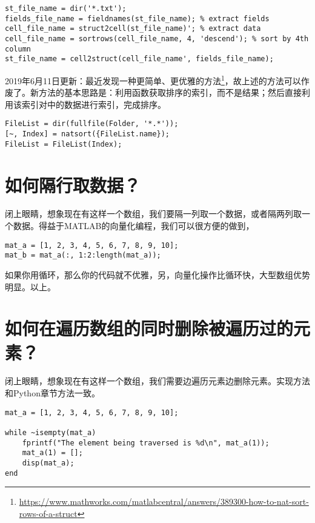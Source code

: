 \begin{verbatim}
st_file_name = dir('*.txt');
fields_file_name = fieldnames(st_file_name); % extract fields
cell_file_name = struct2cell(st_file_name)'; % extract data
cell_file_name = sortrows(cell_file_name, 4, 'descend'); % sort by 4th column
st_file_name = cell2struct(cell_file_name', fields_file_name);
\end{verbatim}

2019年6月11日更新：最近发现一种更简单、更优雅的方法\footnote{\url{https://www.mathworks.com/matlabcentral/answers/389300-how-to-nat-sort-rows-of-a-struct}}，故上述的方法可以作废了。新方法的基本思路是：利用函数获取排序的索引，而不是结果；然后直接利用该索引对中的数据进行索引，完成排序。

\begin{verbatim}
FileList = dir(fullfile(Folder, '*.*'));
[~, Index] = natsort({FileList.name});
FileList = FileList(Index);
\end{verbatim}

\section{如何隔行取数据？}

闭上眼睛，想象现在有这样一个数组\mcode{[1, 2, 3, 4, 5, 6, 7, 8, 9, 10]}，我们要隔一列取一个数据，或者隔两列取一个数据。得益于MATLAB的向量化编程，我们可以很方便的做到，

\begin{verbatim}
mat_a = [1, 2, 3, 4, 5, 6, 7, 8, 9, 10];
mat_b = mat_a(:, 1:2:length(mat_a));
\end{verbatim}

如果你用循环，那么你的代码就不优雅，另，向量化操作比循环快，大型数组优势明显。以上。

\section{如何在遍历数组的同时删除被遍历过的元素？}

闭上眼睛，想象现在有这样一个数组\mcode{[1, 2, 3, 4, 5, 6, 7, 8, 9, 10]}，我们需要边遍历元素边删除元素。实现方法和Python章节方法一致。

\begin{verbatim}
mat_a = [1, 2, 3, 4, 5, 6, 7, 8, 9, 10];

while ~isempty(mat_a)
    fprintf("The element being traversed is %d\n", mat_a(1));
    mat_a(1) = [];
    disp(mat_a);
end
\end{verbatim}

